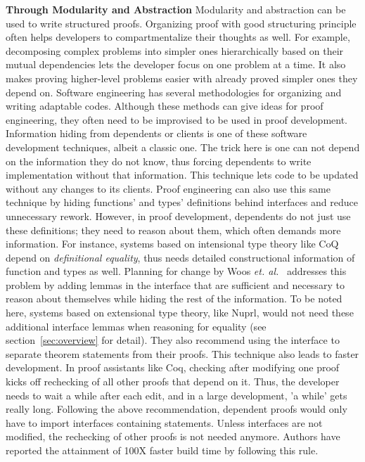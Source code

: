 \textbf{Through Modularity and Abstraction} Modularity and abstraction can be used to write structured proofs. Organizing proof with good structuring principle often helps developers to compartmentalize their thoughts as well. For example, decomposing complex problems into simpler ones hierarchically based on their mutual dependencies lets the developer focus on one problem at a time. It also makes proving higher-level problems easier with already proved simpler ones they depend on. Software engineering has several methodologies for organizing and writing adaptable codes. Although these methods can give ideas for proof engineering, they often need to be improvised to be used in proof development. Information hiding from dependents or clients is one of these software development techniques, albeit a classic one. The trick here is one can not depend on the information they do not know, thus forcing dependents to write implementation without that information. This technique lets code to be updated without any changes to its clients. Proof engineering can also use this same technique by hiding functions' and types' definitions behind interfaces and reduce unnecessary rework. However, in proof development, dependents do not just use these definitions; they need to reason about them, which often demands more information. For instance, systems based on intensional type theory like CoQ depend on \emph{definitional equality}, thus needs detailed constructional information of function and types as well. Planning for change by Woos \emph{et. al.}~\cite{Woos_et_al_2016} addresses this problem by adding lemmas in the interface that are sufficient and necessary to reason about themselves while hiding the rest of the information. To be noted here, systems based on extensional type theory, like Nuprl, would not need these additional interface lemmas when reasoning for equality (see section~\ref{sec:overview} for detail). They also recommend using the interface to separate theorem statements from their proofs. This technique also leads to faster development. In proof assistants like Coq, checking after modifying one proof kicks off rechecking of all other proofs that depend on it. Thus, the developer needs to wait a while after each edit, and in a large development, 'a while' gets really long. Following the above recommendation, dependent proofs would only have to import interfaces containing statements. Unless interfaces are not modified, the rechecking of other proofs is not needed anymore. Authors have reported the attainment of 100X faster build time by following this rule. 


